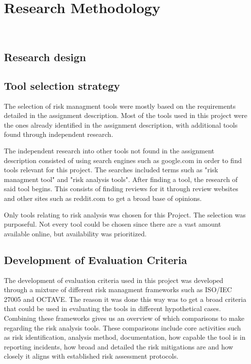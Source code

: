 \section{Research Methodology}
~\label{chap:methodology}
\subsection{Research design}

\subsection{Tool selection strategy}
The selection of risk managment tools were mostly based on the requirements detailed in the assignment description. Most of the tools used in this project were the ones already identified in the assignment description, with additional tools found through independent research. 

The independent research into other tools not found in the assignment description consisted of using search engines such as google.com in order to find tools relevant for this project. The searches included terms such as "risk managment tool" and "risk analysis tools". After finding a tool, the research of said tool begins. This consists of finding reviews for it through review websites and other sites such as reddit.com to get a broad base of opinions.

Only tools relating to risk analysis was chosen for this Project. The selection was purposeful. Not every tool could be chosen since there are a vast amount available online, but availability was prioritized. 


\subsection{Development of Evaluation Criteria}
The development of evaluation criteria used in this project was developed through a mixture of different risk managment frameworks such as ISO/IEC 27005 and OCTAVE. The reason it was done this way was to get a broad criteria that could be used in evaluating the tools in different hypothetical cases. Combining these frameworks gives us an overview of which comparisons to make regarding the risk analysis tools. These comparisons include core activities such as risk identification, analysis method, documentation, how capable the tool is in reporting incidents, how broad and detailed the risk mitigations are and how closely it aligns with established risk assessment protocols.


